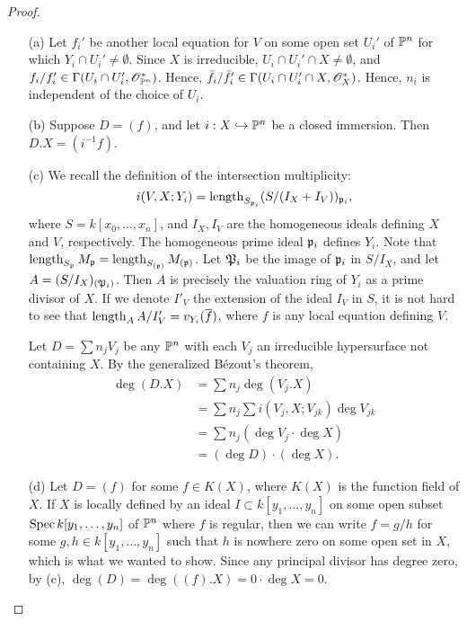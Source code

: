 \documentclass{article}
\begin{document}
\begin{enumerate} [label=\textbf{\arabic*.}, leftmargin=0em]
\begin{proof} $ $ \vspace{0pt}
\begin{itemize} [leftmargin=0cm]
\item[(a)] Let $f_i'$ be another local equation for $V$ on some open set $U_i'$ of $\mathbb{P}^n$ for which $Y_i \cap U_i' \neq \emptyset$. Since $X$ is irreducible, $U_i \cap U_i' \cap X \neq \emptyset$, and $f_i / f_i' \in \Gamma(U_i \cap U_i', \mathscr{O}_{\mathbb{P}^n}^*)$. Hence, $\bar{f}_i / \bar{f}_i' \in \Gamma(U_i \cap U_i' \cap X, \mathscr{O}_X^*)$. Hence, $n_i$ is independent of the choice of $U_i$.

\item[(b)] Suppose $D = (f)$, and let $i : X \hookrightarrow \mathbb{P}^n$ be a closed immersion. Then $D.X = (i^{-1}f)$.

\item[(c)] We recall the definition of the intersection multiplicity:  
\[
    i(V, X; Y_i) = \operatorname{length}_{S_{\mathfrak{p}_i}} (S/(I_X + I_V))_{\mathfrak{p}_i},
\]
where \( S = k[x_0, \dots, x_n] \), and \( I_X, I_V \) are the homogeneous ideals defining \( X \) and \( V \), respectively. The homogeneous prime ideal \( \mathfrak{p}_i \) defines \( Y_i \). Note that $\operatorname{length}_{S_{\mathfrak{p}}} M_{\mathfrak{p}} = \operatorname{length}_{S_{(\mathfrak{p})}} M_{(\mathfrak{p})}$. Let $\mathfrak{P}_i$ be the image of $\mathfrak{p}_i$ in $S / I_X$, and let $A = (S / I_X)_{(\mathfrak{P}_i)}$. Then $A$ is precisely the valuation ring of $Y_i$ as a prime divisor of $X$. If we denote $I'_V$ the extension of the ideal $I_V$ in $S$, it is not hard to see that $\operatorname{length}_A A / I_V' = v_{Y_i}(\overline{f})$, where $f$ is any local equation defining $V$.

Let $D = \sum n_j V_j$ be any $\mathbb{P}^n$ with each $V_j$ an irreducible hypersurface not containing $X$. By the generalized Bézout's theorem,
\begin{align*}
    \deg(D.X) & = \sum n_j \deg(V_j.X) \\
    & = \sum n_j \sum i(V_j, X ; V_{jk}) \deg{V_{jk}} \\
    & = \sum n_j (\deg{V_j} \cdot \deg{X}) \\
    & = (\deg{D}) \cdot (\deg{X}).
\end{align*}

\item[(d)] Let $D = (f)$ for some $f \in K(X)$, where $K(X)$ is the function field of $X$. If $X$ is locally defined by an ideal $I \subset k[y_1, \dots, y_n]$ on some open subset $\operatorname{Spec}{k[y_1, \dots, y_n]}$ of $\mathbb{P}^n$ where $f$ is regular, then we can write $f = g / h$ for some $g, h \in k[y_1, \dots, y_n]$ such that $h$ is nowhere zero on some open set in $X$, which is what we wanted to show. Since any principal divisor has degree zero, by (c), $\deg(D) = \deg((f).X) = 0 \cdot \deg{X} = 0$.
\end{itemize}
\end{proof}


\end{enumerate}
\end{document}
